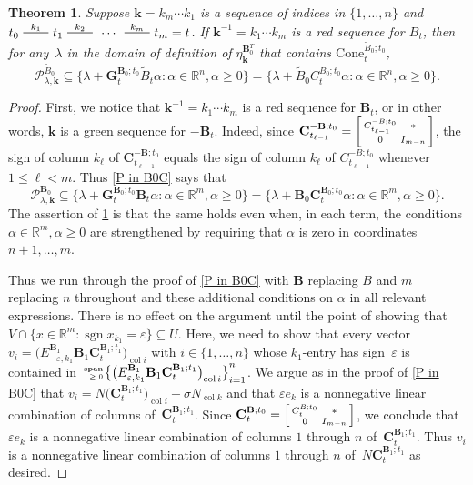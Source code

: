\documentclass{amsart}
\newtheorem{theorem}[proposition]{Theorem}
\theoremstyle{definition}
\theoremstyle{remark}
\numberwithin{equation}{section}
\newcommand{\reals}{\mathbb R}
\newcommand{\edge}{\,\,\rule[2.7pt]{20pt}{0.5pt}\,\,}
\newcommand{\ep}{\varepsilon}
\newcommand{\col}{\operatorname{col}}
\newcommand{\sgn}{\operatorname{sgn}}
\newcommand{\nnspan}{{\!\!\tiny\begin{array}{r}\mathbf{span}\\\ge0\end{array}\hspace*{-0.57em}}}
\newcommand{\set}[1]{{\lbrace #1 \rbrace}}
\newcommand{\sett}[1]{{\bigl\lbrace #1 \bigr\rbrace}}
\newcommand{\GG}{{\mathbf G}}
\newcommand{\CC}{{\mathbf C}}
\newcommand{\0}{{\mathbf{0}}}
\newcommand{\Cone}{\mathrm{Cone}}
\newcommand{\kk}{\mathbf{k}}
\newcommand{\tB}{{\tilde{B}}}
\newcommand{\BB}{\mathbf{B}}
\renewcommand{\P}{\mathcal{P}}
\begin{document}
\begin{theorem}\label{P in B0C extended}
Suppose $\kk=k_m\cdots k_1$ is a sequence of indices in $\set{1,\ldots, n}$ and $t_0\overset{k_1}{\edge}t_1\overset{k_2}{\edge}\,\cdots\,\overset{k_m}{\edge}t_m=t$.
If $\kk^{-1}=k_1\cdots k_m$ is a red sequence for $B_t$, then for any~$\lambda$ in the domain of definition of $\eta_\kk^{\BB_0^T}$ that contains $\Cone^{\tB_0;t_0}_t$,
\[\P^{\tB_0}_{\lambda,\kk}\subseteq\set{\lambda+\GG_t^{\BB_0;t_0}\tB_t\alpha:\alpha\in\reals^n,\alpha\ge0}=\set{\lambda+\tB_0C_t^{B_0;t_0}\alpha:\alpha\in\reals^n,\alpha\ge0}.\]
\end{theorem}
\begin{proof}
First, we notice that $\kk^{-1}=k_1\cdots k_m$ is a red sequence for $\BB_t$, or in other words, $\kk$ is a green sequence for $-\BB_t$.
Indeed, since $\CC_{t_{\ell-1}}^{-\BB;t_0}=\begin{bsmallmatrix}C_{t_{\ell-1}}^{-B;t_0}&*\\0&I_{m-n}\end{bsmallmatrix}$, the sign of column $k_\ell$ of $\CC_{t_{\ell-1}}^{-\BB;t_0}$ equals the sign of column $k_\ell$ of $C_{t_{\ell-1}}^{-B;t_0}$ whenever $1\le\ell<m$.
Thus \cref{P in B0C} says that
\[\P^{\BB_0}_{\lambda,\kk}\subseteq\set{\lambda+\GG_t^{\BB_0;t_0}\BB_t\alpha:\alpha\in\reals^m,\alpha\ge0}=\set{\lambda+\BB_0\CC_t^{\BB_0;t_0}\alpha:\alpha\in\reals^m,\alpha\ge0}.\]
The assertion of \cref{P in B0C extended} is that the same holds even when, in each term, the conditions $\alpha\in\reals^m,\alpha\ge0$ are strengthened by requiring that $\alpha$ is zero in coordinates $n+1,\ldots,m$.

Thus we run through the proof of \cref{P in B0C} with $\BB$ replacing $B$ and $m$ replacing $n$ throughout and these additional conditions on $\alpha$ in all relevant expressions.
There is no effect on the argument until the point of showing that $V\cap\set{x\in\reals^m:\sgn x_{k_1}=\ep}\subseteq U$.
Here, we need to show that every vector $v_i=\bigl(E^{\BB_1}_{-\ep,k_1}\BB_1\CC_t^{\BB_1;t_1}\bigr)_{\col i}$ with $i\in\set{1,\ldots,n}$ whose $k_1$-entry has sign~$\ep$ is contained in $\nnspan\sett{\bigl(E^{\BB_1}_{\ep,k_1}\BB_1\CC_t^{\BB_1;t_1}\bigr)_{\col i}}_{i=1}^n$.
We argue as in the proof of \cref{P in B0C} that $v_i=N\bigl(\CC_t^{\BB_1;t_1}\bigr)_{\col i}+\sigma N_{\col k}$ and that $\ep e_k$ is a nonnegative linear combination of columns of~$\CC_t^{\BB_1;t_1}$.
Since $\CC_t^{\BB;t_0}=\begin{bsmallmatrix}C_t^{B;t_0}&*\\0&I_{m-n}\end{bsmallmatrix}$, we conclude that $\ep e_k$ is a nonnegative linear combination of columns $1$ through $n$ of~$\CC_t^{\BB_1;t_1}$.
Thus $v_i$ is a nonnegative linear combination of columns $1$ through $n$ of~$N\CC_t^{\BB_1;t_1}$ as desired.
\end{proof}
\end{document}
